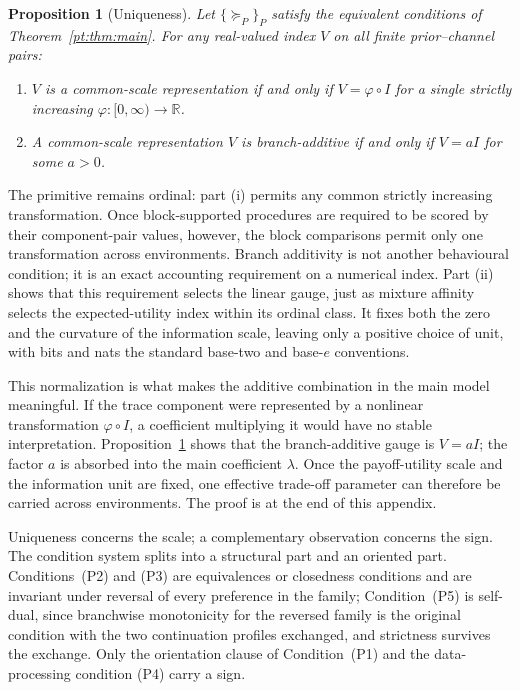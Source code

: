 \documentclass[11pt,a4paper]{article}
\newtheorem{proposition}[theorem]{Proposition}
\theoremstyle{definition}
\newcommand{\R}{\mathbb R}
\newcommand{\1}{\mathbf 1}
\begin{document}
\begin{proposition}[Uniqueness]\label{pt:prop:uniqueness}
Let $\{\succeq_P\}_P$ satisfy the equivalent conditions of Theorem~\ref{pt:thm:main}.  For any real-valued index $V$ on
all finite prior--channel pairs:
\begin{enumerate}[label=\textup{(\roman*)},leftmargin=*]
\item $V$ is a common-scale representation if and only if $V=\varphi\circ I$ for a single strictly increasing
$\varphi:[0,\infty)\to\R$.
\item A common-scale representation $V$ is branch-additive if and only if $V=aI$ for some $a>0$.
\end{enumerate}
\end{proposition}

The primitive remains ordinal: part \textup{(i)} permits any common strictly increasing transformation.  Once
block-supported procedures are required to be scored by their component-pair values, however, the block comparisons
permit only one transformation across environments.  Branch additivity is not another behavioural condition; it is an
exact accounting requirement on a numerical index.  Part \textup{(ii)} shows that this requirement selects the linear
gauge, just as mixture affinity selects the expected-utility index within its ordinal class.  It fixes both the zero
and the curvature of the information scale, leaving only a positive choice of unit, with bits and nats the standard
base-two and base-$e$ conventions.

This normalization is what makes the additive combination in the main model meaningful.  If the trace
component were represented by a nonlinear transformation $\varphi\circ I$, a coefficient multiplying it would have no
stable interpretation.  Proposition~\ref{pt:prop:uniqueness} shows that the branch-additive gauge is $V=aI$; the factor
$a$ is absorbed into the main coefficient $\lambda$.  Once the payoff-utility scale and the information unit are fixed,
one effective trade-off parameter can therefore be carried across environments.  The proof is at the end of this
appendix.

Uniqueness concerns the scale; a complementary observation concerns the sign.  The condition
system splits into a structural part and an oriented part.  Conditions~\textup{(P2)} and \textup{(P3)} are equivalences or
closedness conditions and are invariant under reversal of every preference in the family; Condition~\textup{(P5)} is
self-dual, since branchwise monotonicity for the reversed family is the original condition with the two continuation
profiles exchanged, and strictness survives the exchange.  Only the orientation clause of Condition~\textup{(P1)} and the
data-processing condition \textup{(P4)} carry a sign.
\end{document}
